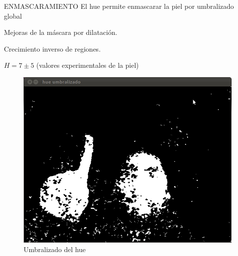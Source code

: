 \documentclass{beamer}
\begin{document}
\begin{frame}{ENMASCARAMIENTO}
	El hue permite enmascarar la piel por umbralizado global

	Mejoras de la máscara por dilatación.

	Crecimiento inverso de regiones.
	
	$H = 7 \pm 5$ (valores experimentales de la piel)

	\begin{figure}[tbhp]
	\centerline{\includegraphics[scale=0.2]{2_hue_umbralizado}}
	\caption{Umbralizado del hue}
	\label{fig:hue_umbral}
	\end{figure}
\end{frame}
\end{document}
